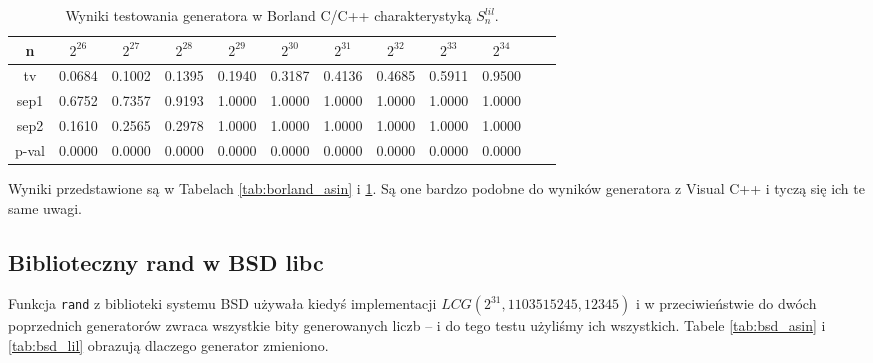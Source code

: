 \documentclass[a4paper,11pt,twoside]{book}
\newcommand{\Slil}[1]{S^{lil}_#1}
\theoremstyle{definition}
\begin{document}
\begin{table}[ht!]
\centering
 \caption{Wyniki testowania generatora w Borland C/C++ charakterystyką $\Slil{n}$.}
 \label{tab:borland_lil}
\begin{tabular} {||c|c|c|c|c|c|c|c|c|c|c|c||}  
 \hline 
     n &  $2^{26}$ &  $2^{27}$ &  $2^{28}$ &  $2^{29}$ &  $2^{30}$ &  $2^{31}$ &  $2^{32}$ &  $2^{33}$ &  $2^{34}$\\ \hline
     tv &  0.0684 &  0.1002 &  0.1395 &  0.1940 &  0.3187 &  0.4136 &  0.4685 &  0.5911 &  0.9500\\ \hline
   sep1 &  0.6752 &  0.7357 &  0.9193 &  1.0000 &  1.0000 &  1.0000 &  1.0000 &  1.0000 &  1.0000\\ \hline
   sep2 &  0.1610 &  0.2565 &  0.2978 &  1.0000 &  1.0000 &  1.0000 &  1.0000 &  1.0000 &  1.0000\\ \hline
  p-val &  0.0000 &  0.0000 &  0.0000 &  0.0000 &  0.0000 &  0.0000 &  0.0000 &  0.0000 &  0.0000\\ \hline
\end{tabular}  
\end{table}
Wyniki przedstawione są w Tabelach \ref{tab:borland_asin} i \ref{tab:borland_lil}. Są one bardzo podobne do wyników generatora z Visual C++ i tyczą się ich te same uwagi.

\FloatBarrier
\subsection{Biblioteczny rand w BSD libc}
Funkcja \texttt{rand} z biblioteki systemu BSD używała kiedyś implementacji $LCG(2^{31}, 1103515245, 12345)$ i w przeciwieństwie do dwóch poprzednich generatorów zwraca wszystkie bity generowanych liczb -- i do tego testu użyliśmy ich wszystkich. Tabele \ref{tab:bsd_asin} i \ref{tab:bsd_lil} obrazują dlaczego generator zmieniono.
\end{document}
